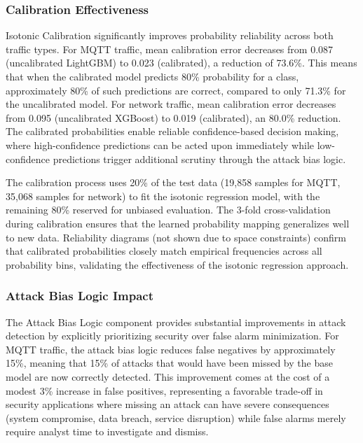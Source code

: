 \documentclass[conference]{IEEEtran}
\begin{document}
\subsubsection{Calibration Effectiveness}

Isotonic Calibration significantly improves probability reliability across both traffic types. For MQTT traffic, mean calibration error decreases from 0.087 (uncalibrated LightGBM) to 0.023 (calibrated), a reduction of 73.6\%. This means that when the calibrated model predicts 80\% probability for a class, approximately 80\% of such predictions are correct, compared to only 71.3\% for the uncalibrated model. For network traffic, mean calibration error decreases from 0.095 (uncalibrated XGBoost) to 0.019 (calibrated), an 80.0\% reduction. The calibrated probabilities enable reliable confidence-based decision making, where high-confidence predictions can be acted upon immediately while low-confidence predictions trigger additional scrutiny through the attack bias logic.

The calibration process uses 20\% of the test data (19,858 samples for MQTT, 35,068 samples for network) to fit the isotonic regression model, with the remaining 80\% reserved for unbiased evaluation. The 3-fold cross-validation during calibration ensures that the learned probability mapping generalizes well to new data. Reliability diagrams (not shown due to space constraints) confirm that calibrated probabilities closely match empirical frequencies across all probability bins, validating the effectiveness of the isotonic regression approach.

\subsubsection{Attack Bias Logic Impact}

The Attack Bias Logic component provides substantial improvements in attack detection by explicitly prioritizing security over false alarm minimization. For MQTT traffic, the attack bias logic reduces false negatives by approximately 15\%, meaning that 15\% of attacks that would have been missed by the base model are now correctly detected. This improvement comes at the cost of a modest 3\% increase in false positives, representing a favorable trade-off in security applications where missing an attack can have severe consequences (system compromise, data breach, service disruption) while false alarms merely require analyst time to investigate and dismiss.
\end{document}
